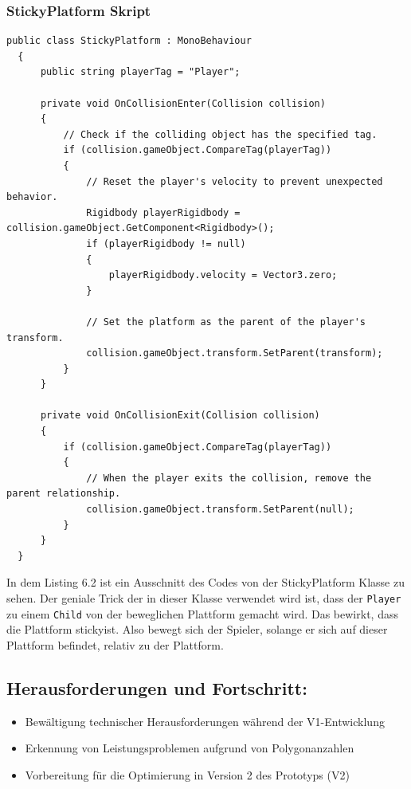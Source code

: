 \pagebreak

\subsubsection{StickyPlatform Skript}

\begin{lstlisting}[language=CSharp,caption={StickyPlatform Klasse.},label=code:mainmenu]
  public class StickyPlatform : MonoBehaviour
  {
      public string playerTag = "Player";
  
      private void OnCollisionEnter(Collision collision)
      {
          // Check if the colliding object has the specified tag.
          if (collision.gameObject.CompareTag(playerTag))
          {
              // Reset the player's velocity to prevent unexpected behavior.
              Rigidbody playerRigidbody = collision.gameObject.GetComponent<Rigidbody>();
              if (playerRigidbody != null)
              {
                  playerRigidbody.velocity = Vector3.zero;
              }
  
              // Set the platform as the parent of the player's transform.
              collision.gameObject.transform.SetParent(transform);
          }
      }
  
      private void OnCollisionExit(Collision collision)
      {
          if (collision.gameObject.CompareTag(playerTag))
          {
              // When the player exits the collision, remove the parent relationship.
              collision.gameObject.transform.SetParent(null);
          }
      }
  }
\end{lstlisting}

In dem Listing 6.2 ist ein Ausschnitt des Codes von der StickyPlatform Klasse zu sehen. Der geniale Trick der in dieser Klasse verwendet wird ist, dass der \verb+Player+ zu einem \verb+Child+ von der beweglichen Plattform gemacht wird. Das bewirkt, dass die Plattform \glqq sticky\grqq ist. Also bewegt sich der Spieler, solange er sich auf dieser Plattform befindet, relativ zu der Plattform.

\pagebreak

\subsection{Herausforderungen und Fortschritt:}
\begin{itemize}
  \item Bewältigung technischer Herausforderungen während der V1-Entwicklung
  \item Erkennung von Leistungsproblemen aufgrund von Polygonanzahlen
  \item Vorbereitung für die Optimierung in Version 2 des Prototyps (V2)
\end{itemize}


